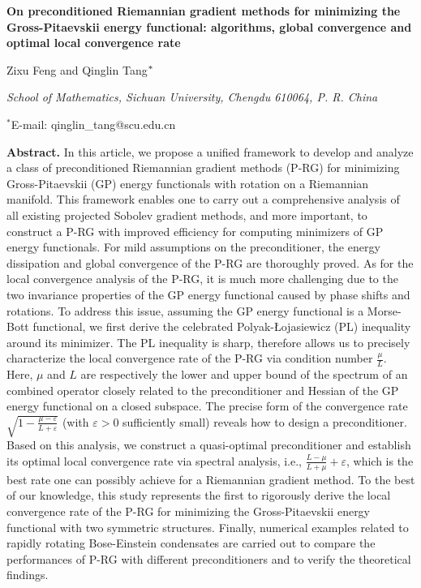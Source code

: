 \documentclass[preprint,3p]{elsarticle}
\begin{document}
\begin{center}
	\large \bf On preconditioned Riemannian gradient methods for minimizing the Gross-Pitaevskii energy functional: algorithms, global convergence and optimal local convergence rate
\end{center}
\vspace{6pt}
\begin{center}
	\large  Zixu Feng  and Qinglin Tang$^{\it *}$
\end{center} 
\vspace{6pt}	

\normalsize
\rm
\begin{center}\it		
	School of Mathematics, Sichuan University, Chengdu 610064,  P. R. China
	
	$^*$E-mail: qinglin\_tang@scu.edu.cn
\end{center}

\footnotesize
\vspace{6pt}
\textbf{Abstract.} In this article, we propose a unified framework to develop and analyze a class of preconditioned Riemannian gradient methods (P-RG) for   minimizing   Gross-Pitaevskii (GP) energy functionals with rotation on a Riemannian manifold. This framework enables one to carry out  a comprehensive analysis of all existing projected Sobolev gradient methods, and more important, to construct a P-RG with improved efficiency for computing minimizers of GP energy functionals. For mild assumptions on the preconditioner, the energy dissipation and global convergence of the P-RG are thoroughly proved. As for the local convergence analysis of the P-RG, it is  much more challenging due to the two invariance properties of the GP energy functional caused by phase shifts and rotations. To address this issue,  assuming  the GP energy functional is a Morse-Bott functional, we first derive the celebrated Polyak-\L ojasiewicz (PL) inequality  around its minimizer. The PL inequality is sharp, therefore allows us to precisely characterize the local convergence rate of the P-RG via condition number $\frac{\mu}{L}$. Here, $\mu$ and $L$ are respectively the lower and upper bound of the spectrum of an combined operator closely related to the preconditioner and Hessian of the GP energy functional on a closed subspace. The precise form of the convergence rate $\sqrt{1-\frac{\mu-\varepsilon}{L+\varepsilon}}$ (with $\varepsilon > 0$ sufficiently small) reveals how to design a preconditioner. Based on this analysis, we construct a quasi-optimal preconditioner and establish its optimal local convergence rate via spectral analysis, i.e., $\frac{L-\mu}{L+\mu}+\varepsilon$, which is the best rate one can possibly achieve for a Riemannian gradient method. To the best of our knowledge, this study represents the first to rigorously derive the local convergence rate of the P-RG for minimizing the Gross-Pitaevskii energy functional with two symmetric structures. Finally, numerical examples related to rapidly rotating Bose-Einstein condensates are carried out to compare the performances of P-RG with different preconditioners and to verify the theoretical findings.
\vspace{6pt}
\end{document}
